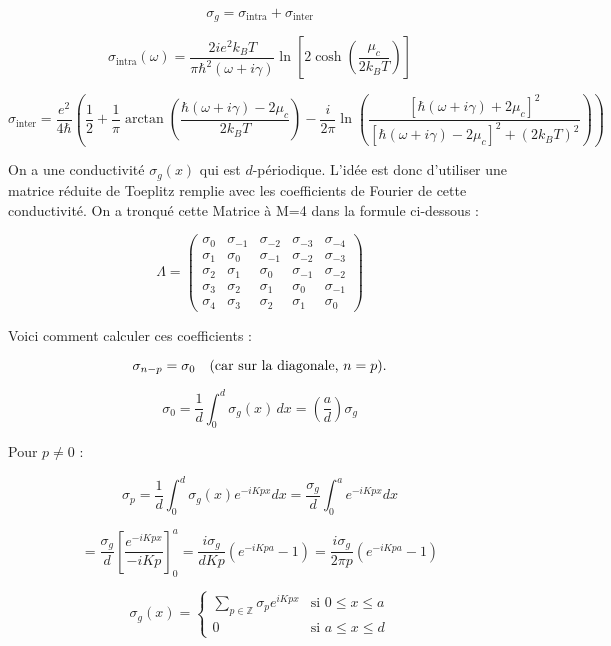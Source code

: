 \documentclass{article}
\begin{document}
\[
\sigma_g = \sigma_{\text{intra}} + \sigma_{\text{inter}}
\]

\[
\sigma_{\text{intra}}(\omega) = \frac{2i e^2 k_B T}{\pi \hbar^2 (\omega + i \gamma)} \ln \left[ 2 \cosh\left(\frac{\mu_c}{2k_B T}\right) \right]
\]

\[
\sigma_{\text{inter}} = \frac{e^2}{4\hbar} \left( \frac{1}{2} + \frac{1}{\pi} \arctan \left( \frac{\hbar(\omega + i\gamma) - 2\mu_c}{2k_B T} \right)
- \frac{i}{2\pi} \ln \left( \frac{[\hbar(\omega + i\gamma) + 2\mu_c]^2}{[\hbar(\omega + i\gamma) - 2\mu_c]^2 + (2k_B T)^2} \right) \right)
\]

\bigskip

On a une conductivité \( \sigma_g(x) \) qui est \( d \)-périodique.  
L'idée est donc d'utiliser une matrice réduite de Toeplitz remplie avec les coefficients de Fourier de cette conductivité. On a tronqué cette Matrice à M=4 dans la formule ci-dessous :

\[
\Lambda = 
\begin{pmatrix}
\sigma_0 & \sigma_{-1} & \sigma_{-2} & \sigma_{-3} & \sigma_{-4} \\
\sigma_1 & \sigma_0     & \sigma_{-1} & \sigma_{-2} & \sigma_{-3} \\
\sigma_2 & \sigma_1     & \sigma_0     & \sigma_{-1} & \sigma_{-2} \\
\sigma_3 & \sigma_2     & \sigma_1     & \sigma_0     & \sigma_{-1} \\
\sigma_4 & \sigma_3     & \sigma_2     & \sigma_1     & \sigma_0
\end{pmatrix}
\]


Voici comment calculer ces coefficients :

\[
\sigma_{n-p} = \sigma_0 \quad \text{(car sur la diagonale, \( n = p \)).}
\]

\[
\sigma_0 = \frac{1}{d} \int_0^d \sigma_g(x)\, dx = \left( \frac{a}{d} \right) \sigma_g
\]

Pour \( p \neq 0 \) :

\[
\sigma_p = \frac{1}{d} \int_0^d \sigma_g(x) e^{-iKp x} dx 
= \frac{\sigma_g}{d} \int_0^a e^{-iKp x} dx
\]

\[
= \frac{\sigma_g}{d} \left[ \frac{e^{-iKp x}}{-iKp} \right]_0^a 
= \frac{i \sigma_g}{d Kp} \left( e^{-iKp a} - 1 \right) 
= \frac{i \sigma_g}{2\pi p} \left( e^{-iKp a} - 1 \right)
\]

\bigskip

\[
\sigma_g(x) = 
\begin{cases}
\sum\limits_{p \in \mathbb{Z}} \sigma_p e^{iKp x} & \text{si } 0 \leq x \leq a \\
0 & \text{si } a \leq x \leq d
\end{cases}
\]
\end{document}
